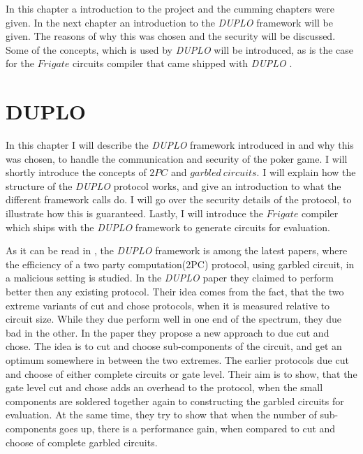 \documentclass[twoside,11pt,openright]{report}
\newcommand{\DUPLO}{\textit{DUPLO} }
\begin{document}
\bigskip

In this chapter a introduction to the project and the cumming chapters were given. In the next chapter an introduction to the \DUPLO framework will be given. The reasons of why this was chosen and the security will be discussed. Some of the concepts, which is used by \DUPLO will be introduced, as is the case for the $Frigate$ circuits compiler that came shipped with \DUPLO.


\chapter{DUPLO}
\label{ch:duplo}

In this chapter I will describe the \DUPLO framework introduced in \cite{duplo} and why this was chosen, to handle the communication and security of the poker game. I will shortly introduce the concepts of $2PC$ and $garbled~circuits$. I will explain how the structure of the \DUPLO protocol works, and give an introduction to what the different framework calls do. I will go over the security details of the protocol, to illustrate how this is guaranteed. Lastly, I will introduce the $Frigate$ compiler which ships with the \DUPLO framework to generate circuits for evaluation.

\bigskip

As it can be read in \cite{duplo}, the \DUPLO framework is among the latest papers, where the efficiency of a two party computation(2PC) protocol, using garbled circuit, in a malicious setting is studied. In the \DUPLO paper they claimed to perform better then any existing protocol. Their idea comes from the fact, that the two extreme variants of cut and chose protocols, when it is measured relative to circuit size. While they due perform well in one end of the spectrum, they due bad in the other. In the paper they propose a new approach to due cut and chose. The idea is to cut and choose sub-components of the circuit, and get an optimum somewhere in between the two extremes. The earlier protocols due cut and choose of either complete circuits or gate level. Their aim is to show, that the gate level cut and chose adds an overhead to the protocol, when the small components are soldered together again to constructing the garbled circuits for evaluation. At the same time, they try to show that when the number of sub-components goes up, there is a performance gain, when compared to cut and choose of complete garbled circuits.
\end{document}

